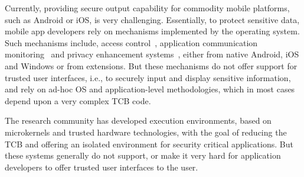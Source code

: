 
Currently, providing secure output capability for commodity mobile platforms, such as Android or iOS, is very challenging. Essentially, to protect sensitive data, mobile app developers rely on mechanisms implemented by the operating system. Such mechanisms include, access control~\cite{smalley2013security,bugiel2011practical,nauman2010apex,kern2012permission,conti2011crepe,russello2012moses,heuser2014asm,backes2014android,wang2015deepdroid,drm}, application communication monitoring~\cite{ongtang2012semantically,dietz2011quire,bugiel2011xmandroid} and privacy enhancement systems~\cite{beresford2011mockdroid,zhou2011taming,shebaro2014identidroid,enck2014taintdroid}, either from native Android, iOS and Windows or from extensions. But these mechanisms do not offer support for trusted user interfaces, i.e., to securely input and display sensitive information, and rely on ad-hoc \ac{OS} and application-level methodologies, which in most cases depend upon a very complex \ac{TCB} code.

The research community has developed execution environments, based on microkernels and trusted hardware technologies, with the goal of reducing the \ac{TCB} and offering an isolated environment for security critical applications. But these systems generally do not support, or make it very hard for application developers to offer trusted user interfaces to the user.

